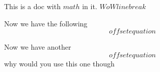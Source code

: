 

This is a doc with $math$ in it. $ W o
W linebreak $

Now we have the following \[ offset equation \]

Now we have another $$
offset equation
$$ why would you use this one though


